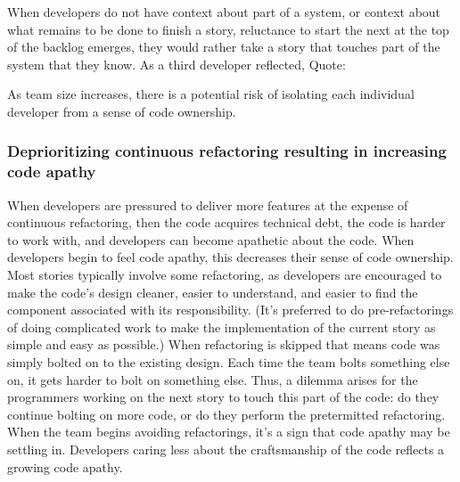When developers do not have context about part of a system, or context about what remains to be done to finish a story, reluctance to start the next at the top of the backlog emerges, they would rather take a story that touches part of the system that they know. As a third developer reflected, Quote: 

As team size increases, there is a potential risk of isolating each individual developer from a sense of code ownership. 


\subsubsection{ Deprioritizing continuous refactoring resulting in increasing code apathy  }

When developers are pressured to deliver more features at the expense of continuous refactoring, then the code acquires technical debt, the code is harder to work with, and developers can become apathetic about the code. When developers begin to feel code apathy, this decreases their sense of code ownership. Most stories typically involve some refactoring, as developers are encouraged to make the code's design cleaner, easier to understand, and easier to find the component associated with its responsibility. (It's preferred to do pre-refactorings of doing complicated work to make the implementation of the current story as simple and easy as possible.) When refactoring is skipped that means code was simply bolted on to the existing design. Each time the team bolts something else on, it gets harder to bolt on something else. Thus, a dilemma arises for the programmers working on the next story to touch this part of the code: do they continue bolting on more code, or do they perform the pretermitted refactoring. When the team begins avoiding refactorings, it's a sign that code apathy may be settling in. Developers caring less about the craftsmanship of the code reflects a growing code apathy. 


